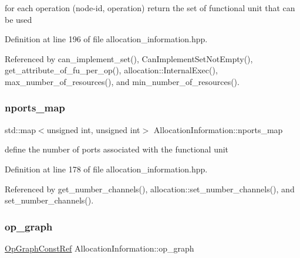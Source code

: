 for each operation (node-\/id, operation) return the set of functional unit that can be used 



Definition at line 196 of file allocation\+\_\+information.\+hpp.



Referenced by can\+\_\+implement\+\_\+set(), Can\+Implement\+Set\+Not\+Empty(), get\+\_\+attribute\+\_\+of\+\_\+fu\+\_\+per\+\_\+op(), allocation\+::\+Internal\+Exec(), max\+\_\+number\+\_\+of\+\_\+resources(), and min\+\_\+number\+\_\+of\+\_\+resources().

\mbox{\label{classAllocationInformation_a7a306a3cfbcbc1ca4878ad0556d97942}} 
\subsubsection{\texorpdfstring{nports\+\_\+map}{nports\_map}}
{\footnotesize\ttfamily std\+::map$<$unsigned int, unsigned int$>$ Allocation\+Information\+::nports\+\_\+map\hspace{0.3cm}{\ttfamily [private]}}



define the number of ports associated with the functional unit 



Definition at line 178 of file allocation\+\_\+information.\+hpp.



Referenced by get\+\_\+number\+\_\+channels(), allocation\+::set\+\_\+number\+\_\+channels(), and set\+\_\+number\+\_\+channels().

\mbox{\label{classAllocationInformation_a28a524a335d74a5e5bf8e32b98d4f8da}} 
\subsubsection{\texorpdfstring{op\+\_\+graph}{op\_graph}}
{\footnotesize\ttfamily \hyperlink{op__graph_8hpp_a9a0b240622c47584bee6951a6f5de746}{Op\+Graph\+Const\+Ref} Allocation\+Information\+::op\+\_\+graph\hspace{0.3cm}{\ttfamily [private]}}



